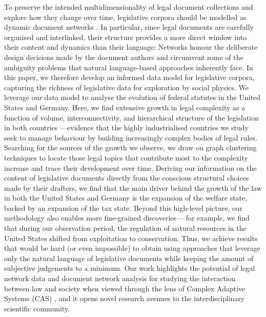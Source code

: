 To preserve the intended multidimensionality of legal document collections and explore how they change over time,
legislative corpora should be modelled as dynamic document networks
\cite{bommarito2010a,katz2014,boulet2011,koniaris2014,sweeney2014,winkels2014,koniaris2018}.
In particular, since legal documents are carefully organised and interlinked,
their structure provides a more direct window into their content and dynamics than their language: 
Networks honour the deliberate design decisions made by the document authors and circumvent some of the ambiguity problems that natural language-based approaches inherently face.
In this paper, we therefore develop an informed data model for legislative corpora,
capturing the richness of legislative data for exploration by social physics. 
We leverage our data model to analyse the evolution of federal statutes in the United States and Germany. 
Here, we find extensive growth in legal complexity as a function of volume, interconnectivity, and hierarchical structure of the legislation in both countries%
---evidence that the highly industrialised countries we study seek to manage behaviour by building increasingly complex bodies of legal rules.
Searching for the sources of the growth we observe, 
we draw on graph clustering techniques
to locate those legal topics that contribute most to the complexity increase and trace their development over time.
Deriving our information on the content of legislative documents directly from the conscious structural choices made by their drafters, 
we find that the main driver behind the growth of the law in both the United States and Germany is the expansion of the welfare state, backed by an expansion of the tax state.
Beyond this high-level picture, our methodology also enables more fine-grained discoveries---%
for example, we find that during our observation period, 
the regulation of natural resources in the United States shifted from exploitation to conservation.
Thus, we achieve results that would be hard (or even impossible) to obtain using approaches that leverage only the natural language of legislative documents  
while keeping the amount of subjective judgements to a minimum.
Our work highlights the potential of legal network data and document network analysis for studying the interaction between law and society when viewed through the lens of Complex Adaptive Systems (CAS)
\cite{post2000,porter2005,fowler2007,schaper2013,ruhl2017,lee2019}, 
and it opens novel research avenues to the interdisciplinary scientific community.
